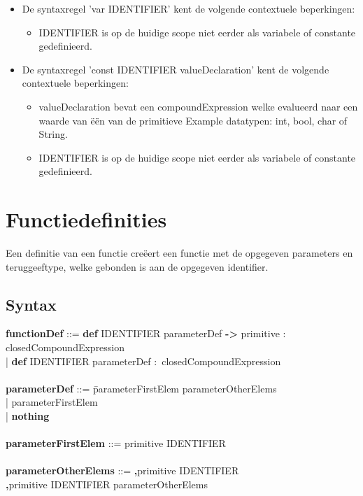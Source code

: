 \begin{itemize}
\begin{itemize}
            \end{itemize}  
        \item De syntaxregel 'var IDENTIFIER' kent de volgende contextuele beperkingen:
            \begin{itemize}
             \item IDENTIFIER is op de huidige scope niet eerder als variabele of constante gedefinieerd.
            \end{itemize}  
        \item De syntaxregel 'const IDENTIFIER valueDeclaration' kent de volgende contextuele beperkingen:
            \begin{itemize}
            \item valueDeclaration bevat een compoundExpression welke evalueerd naar een waarde van \"{e}\"{e}n van de primitieve Example datatypen: int, bool, char of String.
            \item IDENTIFIER is op de huidige scope niet eerder als variabele of constante gedefinieerd.
            \end{itemize}  
        \end{itemize}

\section{Functiedefinities}
Een definitie van een functie cre\"{e}ert een functie met de opgegeven parameters en teruggeeftype, welke gebonden is aan de opgegeven identifier.
    \subsection{Syntax}
        \begin{tabbing}
            {\bf functionDef}                 ::= \= \textbf{def} IDENTIFIER parameterDef \textbf{->} primitive \textbf{$\colon$} closedCompoundExpression\\
                                                  \>| \textbf{def} IDENTIFIER parameterDef \textbf{$\colon$} closedCompoundExpression\\
            \\
            {\bf parameterDef}                ::= \=parameterFirstElem parameterOtherElems\\
                                                  \>| parameterFirstElem\\
                                                  \>| \textbf{nothing}\\
            \\
            {\bf parameterFirstElem}          ::= primitive IDENTIFIER\\
            \\
            {\bf parameterOtherElems}         ::= \=\textbf{,}primitive IDENTIFIER\\
                                                  \>\textbf{,}primitive IDENTIFIER parameterOtherElems\\  
        \end{tabbing}
